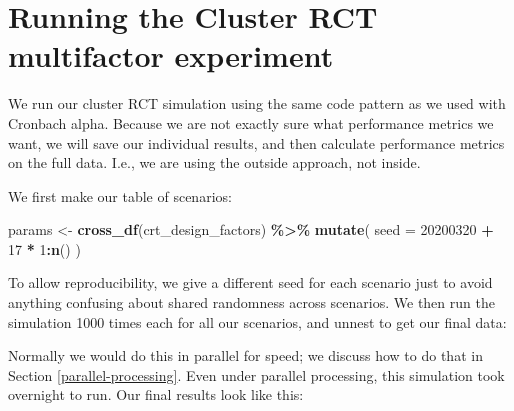\documentclass[
]{book}
\newenvironment{Shaded}{\begin{snugshade}}{\end{snugshade}}
\newcommand{\AttributeTok}[1]{\textcolor[rgb]{0.13,0.29,0.53}{#1}}
\newcommand{\DecValTok}[1]{\textcolor[rgb]{0.00,0.00,0.81}{#1}}
\newcommand{\FunctionTok}[1]{\textcolor[rgb]{0.13,0.29,0.53}{\textbf{#1}}}
\newcommand{\NormalTok}[1]{#1}
\newcommand{\OtherTok}[1]{\textcolor[rgb]{0.56,0.35,0.01}{#1}}
\newcommand{\SpecialCharTok}[1]{\textcolor[rgb]{0.81,0.36,0.00}{\textbf{#1}}}
\newcommand{\StringTok}[1]{\textcolor[rgb]{0.31,0.60,0.02}{#1}}
\begin{document}
\section{Running the Cluster RCT multifactor experiment}\label{running-the-cluster-rct-multifactor-experiment}

We run our cluster RCT simulation using the same code pattern as we used with Cronbach alpha.
Because we are not exactly sure what performance metrics we want, we will save our individual results, and then calculate performance metrics on the full data.
I.e., we are using the outside approach, not inside.

We first make our table of scenarios:

\begin{Shaded}
\begin{Highlighting}[]
\NormalTok{params }\OtherTok{\textless{}{-}} 
  \FunctionTok{cross\_df}\NormalTok{(crt\_design\_factors) }\SpecialCharTok{\%\textgreater{}\%}
  \FunctionTok{mutate}\NormalTok{(}
    \AttributeTok{seed =} \DecValTok{20200320} \SpecialCharTok{+} \DecValTok{17} \SpecialCharTok{*} \DecValTok{1}\SpecialCharTok{:}\FunctionTok{n}\NormalTok{()}
\NormalTok{  )}
\end{Highlighting}
\end{Shaded}

To allow reproducibility, we give a different seed for each scenario just to avoid anything confusing about shared randomness across scenarios.
We then run the simulation 1000 times each for all our scenarios, and unnest to get our final data:

\begin{Shaded}
\end{Shaded}

Normally we would do this in parallel for speed; we discuss how to do that in Section \ref{parallel-processing}.
Even under parallel processing, this simulation took overnight to run.
Our final results look like this:
\end{document}
